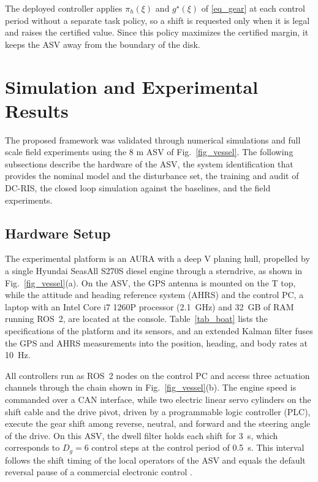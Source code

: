 \documentclass[lettersize,journal]{IEEEtran}
\newcommand{\dcris}{DC-RIS\xspace}
\begin{document}
The deployed controller applies $\pi_h(\xi)$ and $g^\star(\xi)$ of \eqref{eq_gear} at each control period without a separate task policy, so a shift is requested only when it is legal and raises the certified value. Since this policy maximizes the certified margin, it keeps the ASV away from the boundary of the disk.

\section{Simulation and Experimental Results}\label{sec_results}

The proposed framework was validated through numerical simulations and full scale field experiments using the 8 m ASV of Fig.~\ref{fig_vessel}. The following subsections describe the hardware of the ASV, the system identification that provides the nominal model and the disturbance set, the training and audit of \dcris, the closed loop simulation against the baselines, and the field experiments.

\subsection{Hardware Setup}\label{sec_hw}

The experimental platform is an AURA with a deep V planing hull, propelled by a single Hyundai SeasAll S270S diesel engine through a sterndrive, as shown in Fig.~\ref{fig_vessel}(a). On the ASV, the GPS antenna is mounted on the T top, while the attitude and heading reference system (AHRS) and the control PC, a laptop with an Intel Core i7 1260P processor (2.1~GHz) and 32~GB of RAM running ROS~2, are located at the console. Table~\ref{tab_boat} lists the specifications of the platform and its sensors, and an extended Kalman filter fuses the GPS and AHRS measurements into the position, heading, and body rates at 10~Hz.

All controllers run as ROS~2 nodes on the control PC and access three actuation channels through the chain shown in Fig.~\ref{fig_vessel}(b). The engine speed is commanded over a CAN interface, while two electric linear servo cylinders on the shift cable and the drive pivot, driven by a programmable logic controller (PLC), execute the gear shift among reverse, neutral, and forward and the steering angle of the drive.
On this ASV, the dwell filter holds each shift for 3~s, which corresponds to $D_g = 6$ control steps at the control period of 0.5~s. This interval follows the shift timing of the local operators of the ASV and equals the default reversal pause of a commercial electronic control \cite{zf2014clearcommand}.
\end{document}
